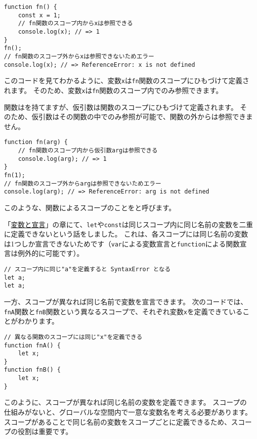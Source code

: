 \begin{lstlisting}
function fn() {
    const x = 1;
    // fn関数のスコープ内からxは参照できる
    console.log(x); // => 1
}
fn();
// fn関数のスコープ外からxは参照できないためエラー
console.log(x); // => ReferenceError: x is not defined
\end{lstlisting}

このコードを見てわかるように、変数\texttt{x}は\texttt{fn}関数のスコープにひもづけて定義されます。
そのため、変数\texttt{x}は\texttt{fn}関数のスコープ内でのみ参照できます。

関数は\textbf{}を持てますが、仮引数は関数のスコープにひもづけて定義されます。
そのため、仮引数はその関数の中でのみ参照が可能で、関数の外からは参照できません。

\begin{lstlisting}
function fn(arg) {
    // fn関数のスコープ内から仮引数argは参照できる
    console.log(arg); // => 1
}
fn(1);
// fn関数のスコープ外からargは参照できないためエラー
console.log(arg); // => ReferenceError: arg is not defined
\end{lstlisting}

このような、関数によるスコープのことを\textbf{}と呼びます。

「\hyperlink{variable-and-declaration}{変数と宣言}」の章にて、\texttt{let}や\texttt{const}は同じスコープ内に同じ名前の変数を二重に定義できないという話をしました。
これは、各スコープには同じ名前の変数は1つしか宣言できないためです（\texttt{var}による変数宣言と\texttt{function}による関数宣言は例外的に可能です）。

\begin{lstlisting}
// スコープ内に同じ"a"を定義すると SyntaxError となる
let a;
let a;
\end{lstlisting}

一方、スコープが異なれば同じ名前で変数を宣言できます。
次のコードでは、\texttt{fnA}関数と\texttt{fnB}関数という異なるスコープで、それぞれ変数\texttt{x}を定義できていることがわかります。

\begin{lstlisting}
// 異なる関数のスコープには同じ"x"を定義できる
function fnA() {
    let x;
}
function fnB() {
    let x;
}
\end{lstlisting}

このように、スコープが異なれば同じ名前の変数を定義できます。
スコープの仕組みがないと、グローバルな空間内で一意な変数名を考える必要があります。
スコープがあることで同じ名前の変数をスコープごとに定義できるため、スコープの役割は重要です。

